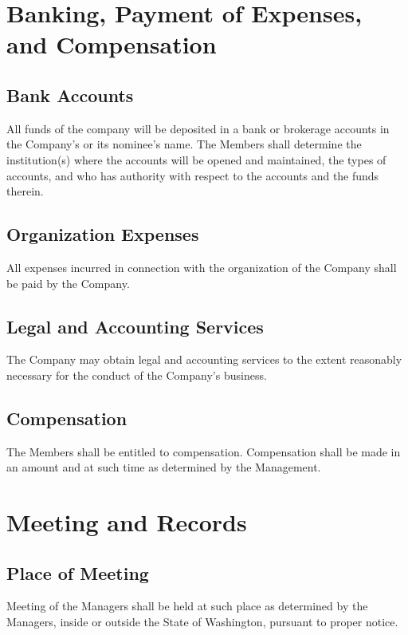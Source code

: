 \documentclass[11pt,onecolumn]{article}
\begin{document}
\section{Banking, Payment of Expenses, and Compensation}

\subsection{Bank Accounts}

All funds of the company will be deposited in a bank or brokerage accounts in the Company's or its nominee's name. The Members shall determine the institution(s) where the accounts will be opened and maintained, the types of accounts, and who has authority with respect to the accounts and the funds therein.

\subsection{Organization Expenses}

All expenses incurred in connection with the organization of the Company shall be paid by the Company.

\subsection{Legal and Accounting Services}

The Company may obtain legal and accounting services to the extent reasonably necessary for the conduct of the Company's business.

\subsection{Compensation}

The Members shall be entitled to compensation. Compensation shall be made in an amount and at such time as determined by the Management.

\section{Meeting and Records}

\subsection{Place of Meeting}

Meeting of the Managers shall be held at such place as determined by the Managers, inside or outside the State of Washington, pursuant to proper notice.
\end{document}
